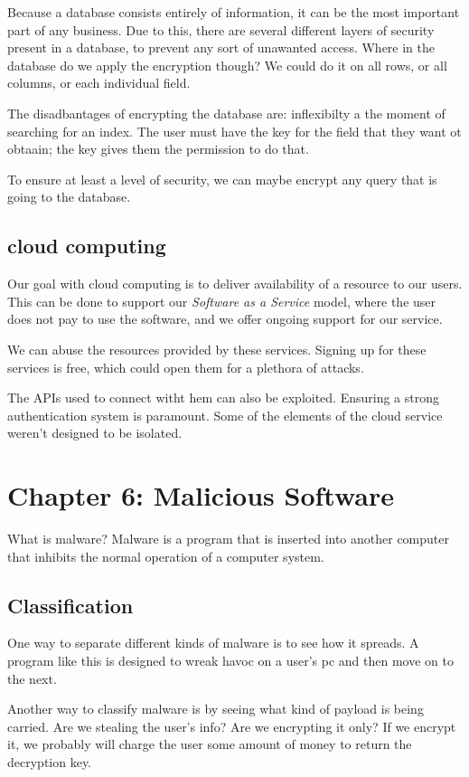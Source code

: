 \documentclass{article}
\begin{document}
 Because a database consists entirely of information, it can be the most important part of any business. 
 Due to this, there are several different layers of security present in a database, to prevent any sort of 
 unawanted access. Where in the database do we apply the encryption though? We could do it on all rows, or 
 all columns, or each individual field.

 The disadbantages of encrypting the database are: inflexibilty a the moment of searching for an index.
 The user must have the key for the field that they want ot obtaain; the key gives them the permission 
 to do that.

 To ensure at least a level of security, we can maybe encrypt any query that is going to the database.
 \subsection{cloud computing}
 Our goal with cloud computing is to deliver availability of a resource to our users. This can be done to support
 our \textit{Software as a Service} model, where the user does not pay to use the software, and we offer ongoing 
 support for our service.

 We can abuse the resources provided by these services. Signing up for these services is free, which could open 
 them for a plethora of attacks.

 The APIs used to connect witht hem can also be exploited. Ensuring a strong authentication system is paramount. 
 Some of the elements of the cloud service weren't designed to be isolated. 
 \section{Chapter 6: Malicious Software}
 What is malware?  Malware is a program that is inserted into another computer that inhibits the normal operation 
 of a computer system. 
 \subsection{Classification}
 One way to separate different kinds of malware is to see how it spreads. A program like this is designed to wreak
 havoc on a user's pc and then move on to the next. 

 Another way to classify malware is by seeing what kind of payload is being carried. Are we stealing the user's info? 
 Are we encrypting it only? If we encrypt it, we probably will charge the user some amount of money to return the 
 decryption key. 
\end{document}
